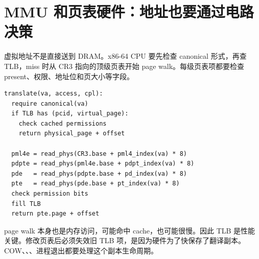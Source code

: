 \section{MMU 和页表硬件：地址也要通过电路决策}

虚拟地址不是直接送到 DRAM。x86-64 CPU 要先检查 canonical 形式，再查 TLB，miss 时从 CR3 指向的顶级页表开始 page walk。每级页表项都要检查 present、权限、地址位和页大小等字段。

\begin{lstlisting}
translate(va, access, cpl):
  require canonical(va)
  if TLB has (pcid, virtual_page):
    check cached permissions
    return physical_page + offset

  pml4e = read_phys(CR3.base + pml4_index(va) * 8)
  pdpte = read_phys(pml4e.base + pdpt_index(va) * 8)
  pde   = read_phys(pdpte.base + pd_index(va) * 8)
  pte   = read_phys(pde.base + pt_index(va) * 8)
  check permission bits
  fill TLB
  return pte.page + offset
\end{lstlisting}

page walk 本身也是内存访问，可能命中 cache，也可能很慢。因此 TLB 是性能关键。修改页表后必须失效旧 TLB 项，是因为硬件为了快保存了翻译副本。COW、、、进程退出都要处理这个副本生命周期。

